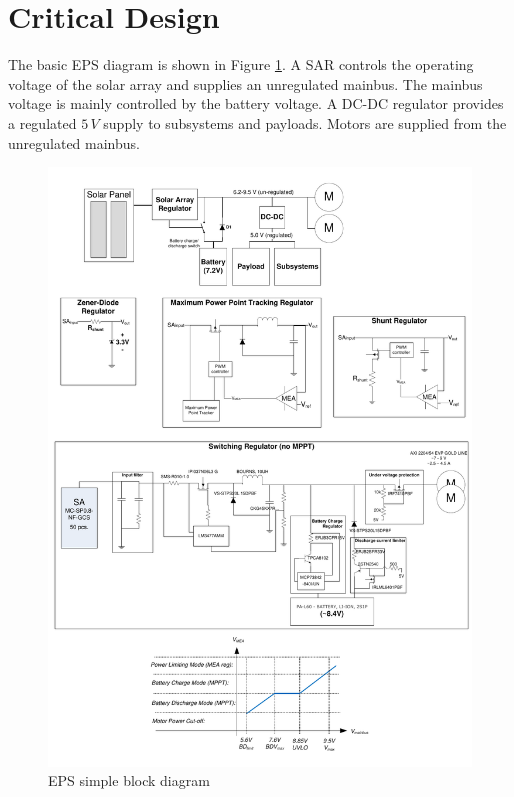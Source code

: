 \section{Critical Design}
\label{sec:critical_design}
%
The basic \ac{EPS} diagram is shown in  Figure \ref{fig:EPS_diagram_simple}. A \ac{SAR} controls the operating voltage of the solar array and supplies an unregulated mainbus. The mainbus voltage is mainly controlled by the battery voltage. A DC-DC regulator provides a regulated $5\,V$ supply to subsystems and payloads. Motors are supplied from the unregulated mainbus.
%
\begin{figure}[H]
\centering
\includegraphics[width=\textwidth]{figures/fig_PDR_EPSdiagram}
\caption{EPS simple block diagram}
\label{fig:EPS_diagram_simple}
\end{figure}
%
%
